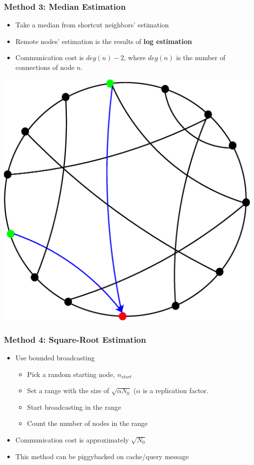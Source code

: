 \documentclass[red]{beamer}
\begin{document}
\begin{frame}
\frametitle{Method 3: Median Estimation}
\begin{minipage}{5cm}
\begin{itemize}
\item Take a median from shortcut neighbors' estimation
\item Remote nodes' estimation is the results of \textbf{log estimation} 
\item Communication cost is $deg(n)-2$, where $deg(n)$ is the number of connections of node $n$.
\end{itemize}
\end{minipage}
\begin{minipage}{5cm}
\centering
\includegraphics[scale=0.2]{figs/method3}
\end{minipage}
\end{frame}
\begin{frame}
\frametitle{Method 4: Square-Root Estimation}
\begin{itemize}
\item Use bounded broadcasting
\begin{itemize}
\item Pick a random starting node, $n_{start}$
\item Set a range with the size of $\sqrt{\alpha N_0}$ ($\alpha$ is a replication factor.
\item Start broadcasting in the range
\item Count the number of nodes in the range
\end{itemize}
\item Communication cost is approximately $\sqrt{N_0}$ 
\item This method can be piggybacked on cache/query message
\end{itemize}
\end{frame}
\end{document}
